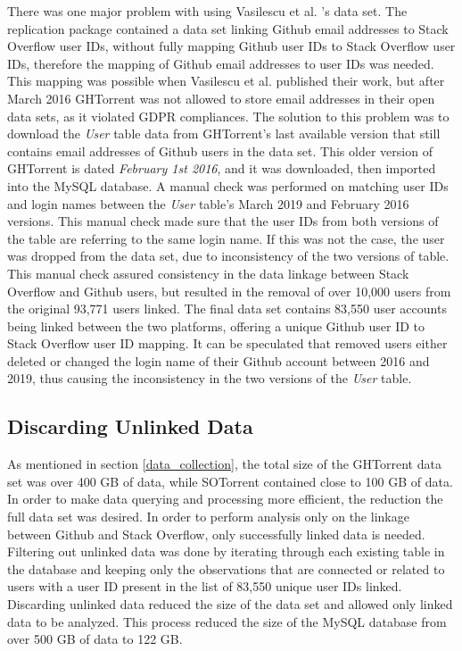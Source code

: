         There was one major problem with using Vasilescu et al. \cite{vasilescu2013stackoverflow}'s data set. The replication package contained a data set linking Github email addresses to Stack Overflow user IDs, without fully mapping Github user IDs to Stack Overflow user IDs, therefore the mapping of Github email addresses to user IDs was needed. This mapping was possible when Vasilescu et al. \cite{vasilescu2013stackoverflow} published their work, but after March 2016 GHTorrent was not allowed to store email addresses in their open data sets, as it violated GDPR compliances. The solution to this problem was to download the \textit{User} table data from GHTorrent's last available version that still contains email addresses of Github users in the data set. This older version of GHTorrent is dated \textit{February 1st 2016}, and it was downloaded, then imported into the MySQL database. A manual check was performed on matching user IDs and login names between the \textit{User} table's March 2019 and February 2016 versions. This manual check made sure that the user IDs from both versions of the table are referring to the same login name. If this was not the case, the user was dropped from the data set, due to inconsistency of the two versions of table. This manual check assured consistency in the data linkage between Stack Overflow and Github users, but resulted in the removal of over 10,000 users from the original 93,771 users linked. The final data set contains 83,550 user accounts being linked between the two platforms, offering a unique Github user ID to Stack Overflow user ID mapping. It can be speculated that removed users either deleted or changed the login name of their Github account between 2016 and 2019, thus causing the inconsistency in the two versions of the \textit{User} table.
        
    \subsection{Discarding Unlinked Data}
       As mentioned in section \ref{data_collection}, the total size of the GHTorrent data set was over 400 GB of data, while SOTorrent contained close to 100 GB of data. In order to make data querying and processing more efficient, the reduction the full data set was desired. In order to perform analysis only on the linkage between Github and Stack Overflow, only successfully linked data is needed. Filtering out unlinked data was done by iterating through each existing table in the database and keeping only the observations that are connected or related to users with a user ID present in the list of 83,550 unique user IDs linked. Discarding unlinked data reduced the size of the data set and allowed only linked data to be analyzed. This process reduced the size of the MySQL database from over 500 GB of data to 122 GB.
        
